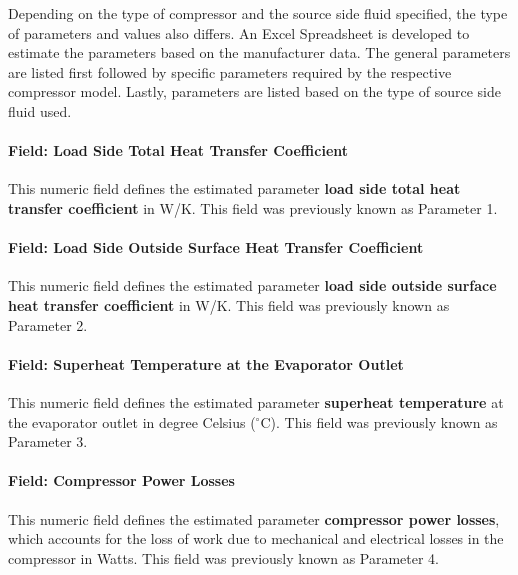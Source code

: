 Depending on the type of compressor and the source side fluid specified, the type of parameters and values also differs. An Excel Spreadsheet is developed to estimate the parameters based on the manufacturer data. The general parameters are listed first followed by specific parameters required by the respective compressor model. Lastly, parameters are listed based on the type of source side fluid used.

\paragraph{Field: Load Side Total Heat Transfer Coefficient}\label{field-load-side-total-heat-transfer-coefficient}

This numeric field defines the estimated parameter \textbf{load side total heat transfer coefficient} in W/K. This field was previously known as Parameter 1.

\paragraph{Field: Load Side Outside Surface Heat Transfer Coefficient}\label{field-load-side-outside-surface-heat-transfer-coefficient}

This numeric field defines the estimated parameter \textbf{load side outside surface heat transfer coefficient} in W/K. This field was previously known as Parameter 2.

\paragraph{Field: Superheat Temperature at the Evaporator Outlet}\label{field-superheat-temperature-at-the-evaporator-outlet}

This numeric field defines the estimated parameter \textbf{superheat temperature} at the evaporator outlet in degree Celsius ($^\circ$C). This field was previously known as Parameter 3.

\paragraph{Field: Compressor Power Losses}\label{field-compressor-power-losses}

This numeric field defines the estimated parameter \textbf{compressor power losses}, which accounts for the loss of work due to mechanical and electrical losses in the compressor in Watts. This field was previously known as Parameter 4.

